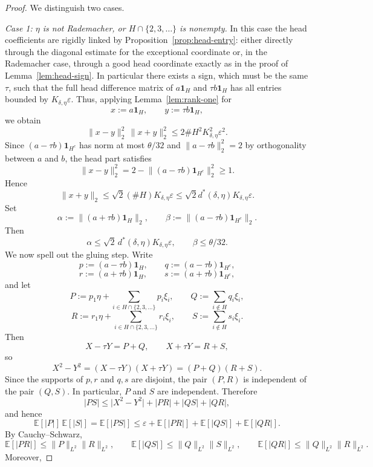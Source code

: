\documentclass[11pt]{amsart}
\numberwithin{equation}{section}
\theoremstyle{definition}
\theoremstyle{remark}
\newcommand{\E}{\mathbb E}
\newcommand{\eps}{\varepsilon}
\newcommand{\abs}[1]{\lvert #1 \rvert}
\newcommand{\norm}[1]{\lVert #1 \rVert}
\begin{document}
\begin{proof}
We distinguish two cases.

\smallskip
\noindent\emph{Case 1: $\eta$ is not Rademacher, or $H\cap\{2,3,\dots\}$ is
nonempty.}
In this case the head coefficients are rigidly linked by
Proposition~\ref{prop:head-entry}: either directly through the diagonal
estimate for the exceptional coordinate or, in the Rademacher case, through a
good head coordinate exactly as in the proof of Lemma~\ref{lem:head-sign}.  In
particular there exists a sign, which must be the same $\tau$, such that the
full head difference matrix of $a\mathbf 1_H$ and $\tau b\mathbf 1_H$ has all
entries bounded by $K_{\delta,\eta}\eps$. Thus, applying Lemma~\ref{lem:rank-one} for
\[
x:=a\mathbf 1_H,
\qquad
y:=\tau b\mathbf 1_H,
\]
we obtain 
\[
\norm{x-y}_2^2\,\norm{x+y}_2^2
\le 2\#H^2 K_{\delta,\eta}^2\eps^2.
\]
Since $(a-\tau b)\mathbf{1}_{H^c}$ has norm at most $\theta/32$ and
$\norm{a-\tau b}_2^2=2$ by orthogonality between $a$ and $b$, the head part satisfies
\[
\norm{x-y}_2^2
=2-\norm{(a-\tau b)\mathbf 1_{H^c}}_2^2
\ge 1.
\]
	Hence
	\[
	\norm{x+y}_2\le \sqrt{2}(\#H) K_{\delta,\eta}\eps
	\le \sqrt{2}d^*(\delta,\eta)K_{\delta,\eta}\eps.
	\]
	Set
	\[
	\alpha:=\norm{(a+\tau b)\mathbf 1_H}_2,
	\qquad
	\beta:=\norm{(a-\tau b)\mathbf 1_{H^c}}_2.
	\]
	Then
	\[
	\alpha\le \sqrt2\,d^*(\delta,\eta)K_{\delta,\eta}\eps,
	\qquad
	\beta\le \theta/32.
	\]
	We now spell out the gluing step.  Write
	\[
	p:=(a-\tau b)\mathbf 1_H,
	\qquad
	q:=(a-\tau b)\mathbf 1_{H^c},
	\]
	\[
	r:=(a+\tau b)\mathbf 1_H,
	\qquad
	s:=(a+\tau b)\mathbf 1_{H^c},
	\]
	and let
	\[
	P:=p_1\eta+\sum_{i\in H\cap\{2,3,\dots\}} p_i\xi_i,
	\qquad
	Q:=\sum_{i\notin H} q_i\xi_i,
	\]
	\[
	R:=r_1\eta+\sum_{i\in H\cap\{2,3,\dots\}} r_i\xi_i,
	\qquad
	S:=\sum_{i\notin H} s_i\xi_i.
	\]
	Then
	\[
	X-\tau Y=P+Q,
	\qquad
	X+\tau Y=R+S,
	\]
	so
	\[
	X^2-Y^2
	=(X-\tau Y)(X+\tau Y)
	=(P+Q)(R+S).
	\]
	Since the supports of $p,r$ and $q,s$ are disjoint, the pair $(P,R)$ is
	independent of the pair $(Q,S)$. In particular, $P$ and $S$ are independent.
	Therefore
	\[
	\abs{PS}\le \abs{X^2-Y^2}+\abs{PR}+\abs{QS}+\abs{QR},
	\]
	and hence
	\begin{equation}
    \label{eq:aux_conc_branch}
	\E[\abs{P}]\,\E[\abs{S}]
	=\E[\abs{PS}]
	\le
	\eps+\E[\abs{PR}]+\E[\abs{QS}]+\E[\abs{QR}].
	\end{equation}
	By Cauchy--Schwarz,
	\[
	\E[\abs{PR}]\le \norm{P}_{L^2}\norm{R}_{L^2},
	\qquad
	\E[\abs{QS}]\le \norm{Q}_{L^2}\norm{S}_{L^2},
	\qquad
	\E[\abs{QR}]\le \norm{Q}_{L^2}\norm{R}_{L^2}.
	\]
	Moreover,

\end{proof}
\end{document}
